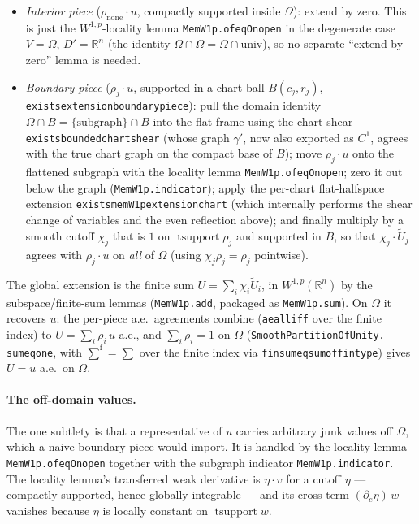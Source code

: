 ﻿\documentclass[12pt, a4paper]{article}
\renewcommand{\_}{\origunderscore\allowbreak}
\theoremstyle{definition}
\theoremstyle{plain}
\begin{document}
\begin{itemize}
  \item \emph{Interior piece} ($\rho_{\text{none}}\!\cdot\!u$, compactly supported inside $\Omega$):
  extend by zero.  This is just the $W^{1,p}$-locality lemma \texttt{MemW1p.of\_eqOn\_open} in the
  degenerate case $V=\Omega$, $D'=\mathbb R^n$ (the identity $\Omega\cap\Omega=\Omega\cap\text{univ}$),
  so no separate ``extend by zero'' lemma is needed.
  \item \emph{Boundary piece} ($\rho_j\!\cdot\!u$, supported in a chart ball
  $B(c_j,r_j)$, \texttt{exists\_extension\_boundary\_piece}): pull the domain identity
  $\Omega\cap B=\{\text{subgraph}\}\cap B$ into the flat frame using the chart shear
  \texttt{exists\_bounded\_chart\_shear} (whose graph $\gamma'$, now also exported as $C^1$,
  agrees with the true chart graph on the compact base of $B$); move $\rho_j\!\cdot\!u$ onto the
  flattened subgraph with the locality lemma \texttt{MemW1p.of\_eqOn\_open}; zero it out below the
  graph (\texttt{MemW1p.indicator}); apply the per-chart flat-halfspace extension
  \texttt{exists\_memW1p\_extension\_chart} (which internally performs the shear change of variables and
  the even reflection above); and finally multiply by a smooth cutoff $\chi_j$ that is $1$ on
  $\operatorname{tsupport}\rho_j$ and supported in $B$, so that $\chi_j\!\cdot\!\tilde U_j$ agrees with
  $\rho_j\!\cdot\!u$ on \emph{all} of $\Omega$ (using $\chi_j\rho_j=\rho_j$ pointwise).
\end{itemize}

The global extension is the finite sum $U=\sum_i\chi_i\tilde U_i$, in $W^{1,p}(\mathbb R^n)$ by the
subspace/finite-sum lemmas (\texttt{MemW1p.add}, packaged as \texttt{MemW1p.sum}).  On $\Omega$ it
recovers $u$: the per-piece a.e.\ agreements combine (\texttt{ae\_all\_iff} over the finite index) to
$U=\sum_i\rho_i\,u$ a.e., and $\sum_i\rho_i=1$ on $\Omega$ (\texttt{SmoothPartitionOfUnity.\allowbreak
sum\_eq\_one}, with $\sum^{\mathrm f}=\sum$ over the finite index via
\texttt{finsum\_eq\_sum\_of\_fintype}) gives $U=u$ a.e.\ on $\Omega$.

\paragraph{The off-domain values.}  The one subtlety is that a representative of $u$ carries arbitrary
junk values off $\Omega$, which a naive boundary piece would import.  It is handled by the locality
lemma \texttt{MemW1p.of\_eqOn\_open} together with the subgraph indicator \texttt{MemW1p.indicator}.
The locality lemma's transferred weak derivative is $\eta\!\cdot\!v$ for a cutoff $\eta$ --- compactly
supported, hence globally integrable --- and its cross term $(\partial_e\eta)\,w$ vanishes because
$\eta$ is locally constant on $\operatorname{tsupport}w$.
\end{document}
